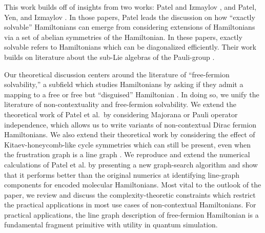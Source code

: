 \documentclass[%
 aip,
 amsmath,amssymb,
 reprint,%
]{revtex4-1}
\begin{document}
This work builds off of insights from two works: Patel and Izmaylov \cite{patel2024exactly}, and Patel, Yen, and Izmaylov \cite{patel2023extensionexactlysolvablehamiltoniansusing}. In those papers, Patel leads the discussion on how \enquote{exactly solvable} Hamiltonians can emerge from considering extensions of Hamiltonians via a set of abelian symmetries of the Hamiltonian. In these papers, exactly solvable refers to Hamiltonians which can be diagonalized efficiently. Their work builds on literature about the sub-Lie algebras of the Pauli-group \cite{aguilar2024classificationpauliliealgebras}. 

Our theoretical discussion centers around the literature of \enquote{free-fermion solvability,} a subfield which studies Hamiltonians by asking if they admit a mapping to a free or free but \enquote{disguised} Hamiltonian \cite{Chapman_Fermions, fermion_unified, Elman_Fermions}. In doing so, we unify the literature of non-contextuality and free-fermion solvability. We extend the theoretical work of Patel et al.\ by considering Majorana or Pauli operator independence, which allows us to write variants of non-contextual Dirac fermion Hamiltonians. We also extend their theoretical work by considering the effect of Kitaev-honeycomb-like cycle symmetries which can still be present, even when the frustration graph is a line graph \cite{Kitaev_2006, Chapman_Fermions}. We reproduce and extend the numerical calculations of Patel et al. by presenting a new graph-search algorithm and show that it performs better than the original numerics at identifying line-graph components for encoded molecular Hamiltonians. Most vital to the outlook of the paper, we review and discuss the complexity-theoretic constraints which restrict the practical applications in most use cases of non-contextual Hamiltonians. %
For practical applications, the line graph description of free-fermion Hamiltonian is a fundamental fragment primitive with utility in quantum simulation. 
\end{document}
